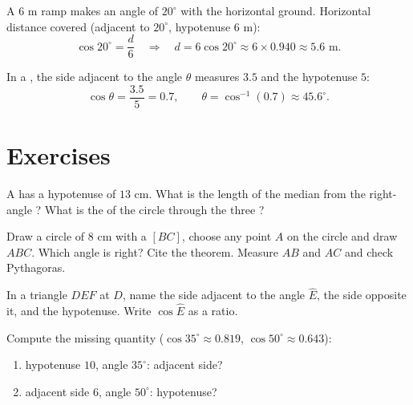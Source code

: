 \begin{example}\label{ex:g8:cosine:side}
A $6$ m ramp makes an angle of $20^\circ$ with the horizontal ground.
Horizontal distance covered (adjacent to $20^\circ$, hypotenuse
$6$ m):
\[
\cos 20^\circ = \frac{d}{6}
\quad\Longrightarrow\quad
d = 6 \cos 20^\circ \approx 6 \times 0.940 \approx 5.6 \text{ m}.
\]
\end{example}

\begin{example}\label{ex:g8:cosine:angle}
In a , the side adjacent to the angle $\theta$ measures
$3.5$ and the hypotenuse $5$:
\[
\cos\theta = \frac{3.5}{5} = 0.7,
\qquad
\theta = \cos^{-1}(0.7) \approx 45.6^\circ .
\]
\end{example}

\section{Exercises}

\begin{exercise}[$\star$]\label{exo:g8:cosine:1}
A  has a hypotenuse of $13$ cm. What is the length of
the median from the right-angle ? What is the  of the
circle through the three ?
\end{exercise}

\begin{exercise}[$\star$]\label{exo:g8:cosine:2}
Draw a circle of  $8$ cm with a  $[BC]$, choose any
point $A$ on the circle and draw $ABC$. Which angle is right? Cite
the theorem. Measure $AB$ and $AC$ and check Pythagoras.
\end{exercise}

\begin{exercise}[$\star$]\label{exo:g8:cosine:3}
In a triangle $DEF$  at $D$, name the side adjacent to
the angle $\widehat E$, the side opposite it, and the hypotenuse.
Write $\cos \widehat E$ as a ratio.
\end{exercise}

\begin{exercise}[$\star$]\label{exo:g8:cosine:4}
Compute the missing quantity ($\cos 35^\circ \approx 0.819$,
$\cos 50^\circ \approx 0.643$):
\begin{enumerate}
  \item hypotenuse $10$, angle $35^\circ$: adjacent side?
  \item adjacent side $6$, angle $50^\circ$: hypotenuse?
\end{enumerate}
\end{exercise}

